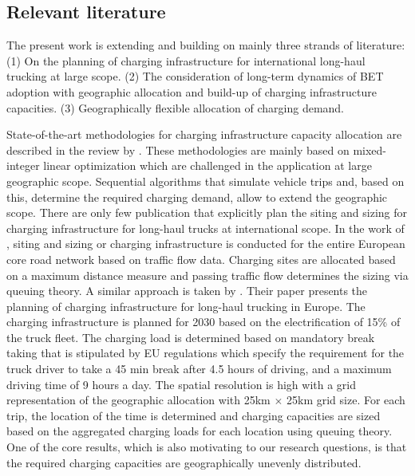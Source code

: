 \documentclass[preprint,10pt,review, authoryear]{elsarticle}
\begin{document}
    \subsection{Relevant literature}
  
    The present work is extending and building on mainly three strands of literature: (1) On the  planning of charging infrastructure for international long-haul trucking at large scope. (2) The consideration of long-term dynamics of BET adoption with geographic allocation and build-up of charging infrastructure capacities. (3) Geographically flexible allocation of charging demand.

    State-of-the-art methodologies for charging infrastructure capacity allocation are described in the review by \citet{Metais2022}. These methodologies are mainly based on mixed-integer linear optimization which are challenged in the application at large geographic scope. Sequential algorithms that simulate vehicle trips and, based on this, determine the required charging demand, allow to extend the geographic scope. 
    There are only few publication that explicitly plan the siting and sizing for charging infrastructure for long-haul trucks at international scope. In the work of \citet{wevj13090162}, siting and sizing or charging infrastructure is conducted for the entire European core road network based on traffic flow data. Charging sites are allocated based on a maximum distance measure and passing traffic flow determines the sizing via queuing theory. A similar approach is taken by \citet{SHOMAN2023103825}. Their paper presents the planning of charging infrastructure for long-haul trucking in Europe. The charging infrastructure is planned for 2030 based on the electrification of 15\% of the truck fleet. The charging load is determined based on mandatory break taking that is stipulated by EU regulations which specify the requirement for the truck driver to take a 45 min break after 4.5 hours of driving, and a maximum driving time of 9 hours a day. The spatial resolution is high with a grid representation of the geographic allocation with 25km $\times$ 25km grid size. For each trip, the location of the time is determined and charging capacities are sized based on the aggregated charging loads for each location using queuing theory. One of the core results, which is also motivating to our research questions, is that the required charging capacities are geographically unevenly distributed. 
\end{document}
